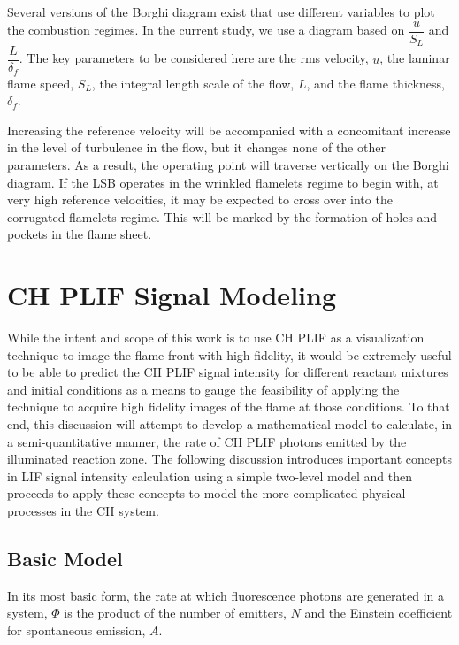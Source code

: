 Several versions of the Borghi diagram exist that use different variables to plot the combustion regimes.
In the current study, we use a diagram based on \(\dfrac{ u }{ S_L }\) and \(\dfrac{ L }{ \delta_f }\).
The key parameters to be considered here are the rms velocity, \(u\), the laminar flame speed, \(S_L\), the integral length scale of the flow, \(L\), and the flame thickness, \(\delta_f\).

Increasing the reference velocity will be accompanied with a concomitant increase in the level of turbulence in the flow, but it changes none of the other parameters.
As a result, the operating point will traverse vertically on the Borghi diagram.
If the LSB operates in the wrinkled flamelets regime to begin with, at very high reference velocities, it may be expected to cross over into the corrugated flamelets regime.
This will be marked by the formation of holes and pockets in the flame sheet.

\section{CH PLIF Signal Modeling}
\label{sec:background-chplif-signal-modeling}

While the intent and scope of this work is to use CH PLIF as a visualization technique to image the flame front with high fidelity, it would be extremely useful to be able to predict the CH PLIF signal intensity for different reactant mixtures and initial conditions as a means to gauge the feasibility of applying the technique to acquire high fidelity images of the flame at those conditions.
To that end, this discussion will attempt to develop a mathematical model to calculate, in a semi-quantitative manner, the rate of CH PLIF photons emitted by the illuminated reaction zone.
The following discussion introduces important concepts in LIF signal intensity calculation using a simple two-level model and then proceeds to apply these concepts to model the more complicated physical processes in the CH system.

\subsection{Basic Model}
\label{subsec:chplif-basic-model}

In its most basic form, the rate at which fluorescence photons are generated in a system, \(\Phi\) is the product of the number of emitters, \(N\) and the Einstein coefficient for spontaneous emission, \(A\).

